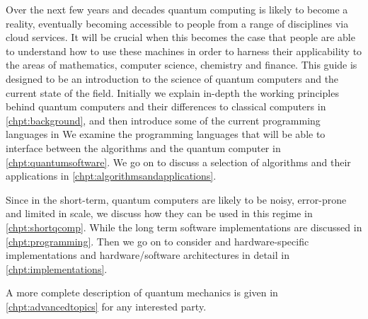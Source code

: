 Over the next few years and decades quantum computing is likely to become a reality, eventually becoming accessible to people from a range of disciplines via cloud services. It will be crucial when this becomes the case that people are able to understand how to use these machines in order to harness their applicability to the areas of mathematics, computer science, chemistry and finance. This guide is designed to be an introduction to the science of quantum computers and the current state of the field. Initially we explain in-depth the working principles behind quantum computers and their differences to classical computers in \autoref{chpt:background}, and then introduce some of the current programming languages in We examine the programming languages that will be able to interface between the algorithms and the quantum computer in \autoref{chpt:quantumsoftware}. We go on to discuss a selection of algorithms and their applications in \autoref{chpt:algorithmsandapplications}.  

 Since in the short-term, quantum computers are likely to be noisy, error-prone and limited in scale, we discuss how they can be used in this regime in \autoref{chpt:shortqcomp}. While the long term software implementations are discussed in \autoref{chpt:programming}. Then we go on to consider and hardware-specific implementations and hardware/software architectures in detail in \autoref{chpt:implementations}. 

A more complete description of quantum mechanics is given in \autoref{chpt:advancedtopics} for any interested party. 
